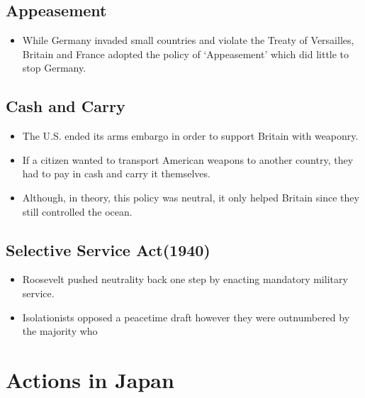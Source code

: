 \documentclass[12pt]{article} %
\begin{document}
	\subsection{Appeasement}
	\begin{itemize}
		\item While Germany invaded small countries and violate the Treaty of Versailles, Britain and France
			adopted the policy of `Appeasement' which did little to stop Germany.
	\end{itemize}

	\subsection{Cash and Carry}
	\begin{itemize}
		\item The U.S. ended its arms embargo in order to support Britain with weaponry.
		\item If a citizen wanted to transport American weapons to another country, they had to pay in cash
			and carry it themselves.
		\item Although, in theory, this policy was neutral, it only helped Britain since they still controlled
			the ocean.
	\end{itemize}

	\subsection{Selective Service Act(1940)}
	\begin{itemize}
		\item Roosevelt pushed neutrality back one step by enacting mandatory military service.
		\item Isolationists opposed a peacetime draft however they were outnumbered by the majority who 
	\end{itemize}

	\section{Actions in Japan}




	\newpage
\end{document}
